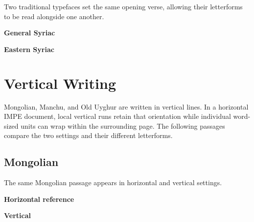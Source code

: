 \documentclass[11pt,twoside]{impeart}
\begin{document}

Two traditional typefaces set the same opening verse, allowing their
letterforms to be read alongside one another.

\noindent
\begin{minipage}[t]{0.47\linewidth}
\textbf{General Syriac}

\medskip

\end{minipage}
\hfill
\begin{minipage}[t]{0.47\linewidth}
\textbf{Eastern Syriac}

\medskip

\end{minipage}

\section{Vertical Writing}

Mongolian, Manchu, and Old Uyghur are written in vertical lines. In a
horizontal IMPE document, local vertical runs retain that orientation while
individual word-sized units can wrap within the surrounding page. The
following passages compare the two settings and their different letterforms.

\subsection{Mongolian}

The same Mongolian passage appears in horizontal and vertical settings.

\noindent
\begin{minipage}[t]{0.47\linewidth}
\raggedright
\textbf{Horizontal reference}

\medskip

\end{minipage}
\hfill
\begin{minipage}[t]{0.47\linewidth}
\raggedright
\textbf{Vertical}

\medskip

\end{minipage}
\end{document}
